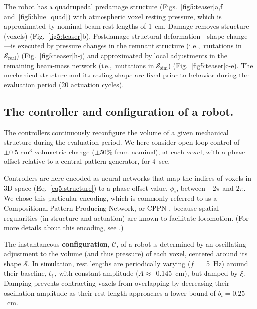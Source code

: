 The robot has a quadrupedal predamage structure (Figs.~\ref{fig5:teaser}a,f and~\ref{fig5:blue_quad}) with atmospheric voxel resting pressure, which is approximated by nominal beam rest lengths of 1~cm.
Damage removes structure (voxels) (Fig.~\ref{fig5:teaser}b).
Postdamage structural deformation---shape change---is executed by pressure changes in the remnant structure (i.e.,~mutations in $\mathcal{S}_{\text{real}}$) \mbox{(Fig.~\ref{fig5:teaser}h-j)} and approximated by local adjustments in the remaining beam-mass network (i.e.,~mutations in $\mathcal{S}_{\text{sim}}$) (Fig.~\ref{fig5:teaser}c-e).
The mechanical structure and its resting shape are fixed prior to behavior during the evaluation period (20 actuation cycles).


\subsection*{The controller and configuration of a robot.}
\label{sec5:methods:controller}


The controllers continuously reconfigure the volume of a given mechanical structure during the evaluation period.
We here consider open loop control of 
$\pm0.5$ cm$^3$ volumetric change ($\pm50\%$ from nominal),
at each voxel, with a phase offset relative to a central pattern generator, for 4~sec.

Controllers are here encoded as neural networks that map the indices of voxels in 3D space (Eq.~\ref{eq5:structure}) to a phase offset value, $\phi_i$, between $-2\pi$ and $2\pi$.
We chose this particular encoding, which is commonly referred to as a Compositional Pattern-Producing Network, or CPPN \cite{stanley2007compositional},
because spatial regularities (in structure and actuation) are known to facilitate locomotion.
(For more details about this encoding, see \cite{cheney2013unshackling}.)


The instantaneous \textbf{configuration}, 
$\mathcal{C}$,
of a robot is determined by an oscillating adjustment to the volume (and thus pressure) of each voxel,
centered around its shape $\mathcal{S}$.
In simulation, rest lengths are
periodically varying \mbox{($f=$ 5~Hz)} around their baseline, $b_i\,$,
with constant amplitude
\mbox{($A\approx$~0.145~cm)}, but damped by $\xi$.
Damping prevents contracting voxels from overlapping by decreasing their oscillation amplitude as their rest length approaches a lower bound of $b_i=0.25$~cm.

